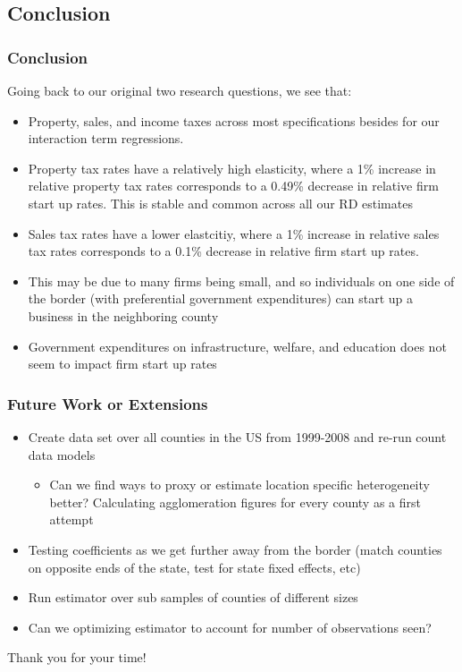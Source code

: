 \documentclass{beamer}
\begin{document}
\begin{frame}
\section{Conclusion}
\frametitle{Conclusion}
Going back to our original two research questions, we see that:
\begin{itemize}
\item Property, sales, and income taxes across most specifications besides for our interaction term regressions. 
\item Property tax rates have a relatively high elasticity, where a 1\% increase in relative property tax rates corresponds to a 0.49\% decrease in relative firm start up rates. This is stable and common across all our RD estimates
\item Sales tax rates have a lower elastcitiy, where a 1\% increase in relative sales tax rates corresponds to a 0.1\% decrease in relative firm start up rates.
\item This may be due to many firms being small, and so individuals on one side of the border (with preferential government expenditures) can start up a business in the neighboring county
\item Government expenditures on infrastructure, welfare, and education does not seem to impact firm start up rates

\end{itemize}
\end{frame}

\begin{frame}
\frametitle{Future Work or Extensions}
\begin{itemize}
\item Create data set over all counties in the US from 1999-2008 and re-run count data models
\begin{itemize}
\item Can we find ways to proxy or estimate location specific heterogeneity better? Calculating agglomeration figures for every county as a first attempt
\end{itemize}
\item Testing coefficients as we get further away from the border (match counties on opposite ends of the state, test for state fixed effects, etc)
\item Run estimator over sub samples of counties of different sizes
\item Can we optimizing estimator to account for number of observations seen?
\end{itemize}
\end{frame}

\begin{frame}
\begin{centering}
\huge{Thank you for your time!}
\end{centering}
\end{frame}
\end{document}
